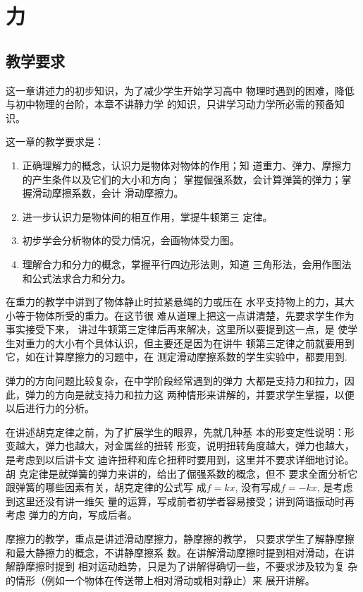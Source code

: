 \chapter{力}\minitoc[n]
\section{教学要求}
这一章讲述力的初步知识，为了减少学生开始学习高中
物理时遇到的困难，降低与初中物理的台阶，本章不讲静力学
的知识，只讲学习动力学所必需的预备知识。


这一章的教学要求是：

\begin{enumerate}
\item 正确理解力的概念，认识力是物体对物体的作用；知
道重力、弹力、摩擦力的产生条件以及它们的大小和方向；
掌握倔强系数，会计算弹簧的弹力；掌握滑动摩擦系数，会计
滑动摩擦力。
\item 进一步认识力是物体间的相互作用，掌提牛顿第三
定律。
\item 
初步学会分析物体的受力情况，会画物体受力图。
\item 理解合力和分力的概念，掌握平行四边形法则，知道
三角形法，会用作图法和公式法求合力和分力。
\end{enumerate}

在重力的教学中讲到了物体静止时拉紧悬绳的力或压在
水平支持物上的力，其大小等于物体所受的重力。在这节很
难从道理上把这一点讲清楚，先要求学生作为事实接受下来，
讲过牛顿第三定律后再来解决，这里所以要提到这一点，是
使学生对重力的大小有个具体认识，但主要还是因为在讲牛
顿第三定律之前就要用到它，如在计算摩擦力的习题中，在
测定滑动摩擦系数的学生实验中，都要用到.

弹力的方向问题比较复杂，在中学阶段经常遇到的弹力
大都是支持力和拉力，因此，弹力的方向是就支持力和拉力这
两种情形来讲解的，并要求学生掌握，以便以后进行力的分析。

在讲述胡克定律之前，为了扩展学生的眼界，先就几种基
本的形变定性说明：形变越大，弹力也越大，对金属丝的扭转
形变，说明扭转角度越大，弹力也越大，是考虑到以后讲卡文
迪许扭秤和库仑扭秤时要用到，这里并不要求详细地讨论。胡
克定律是就弹簧的弹力来讲的，给出了倔强系数的概念，但不
要求全面分析它跟弹簧的哪些因素有关，胡克定律的公式写
成$f=kx$, 没有写成$f=-kx$, 是考虑到这里还没有讲一维矢
量的运算，写成前者初学者容易接受；讲到简谐振动时再考虑
弹力的方向，写成后者。

摩擦力的教学，重点是讲述滑动摩擦力，静摩擦的教学，
只要求学生了解静摩擦和最大静擦力的概念，不讲静摩擦系
数。在讲解滑动摩擦时提到相对滑动，在讲解静摩擦时提到
相对运动趋势，只是为了讲解得确切一些，不要求涉及较为复
杂的情形（例如一个物体在传送带上相对滑动或相对静止）来
展开讲解。

